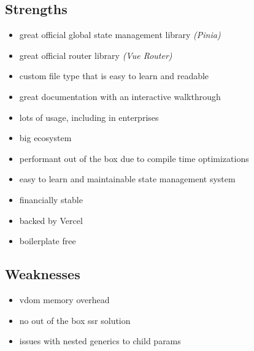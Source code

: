 \subsection{Strengths}
\label{subsec:vue:strengths}
\begin{itemize}
    \item great official global state management library \textit{(Pinia)}
    \item great official router library \textit{(Vue Router)}
    \item custom file type that is easy to learn and readable
    \item great documentation with an interactive walkthrough
    \item lots of usage, including in enterprises
    \item big ecosystem
    \item performant out of the box due to compile time optimizations
    \item easy to learn and maintainable state management system
    \item financially stable
    \item backed by Vercel
    \item boilerplate free
\end{itemize}

\subsection{Weaknesses}
\label{subsec:vue:weaknesses}
\begin{itemize}
    \item \acrshort{vdom} memory overhead
    \item no out of the box \acrshort{ssr} solution
    \item issues with nested generics to child params
\end{itemize}